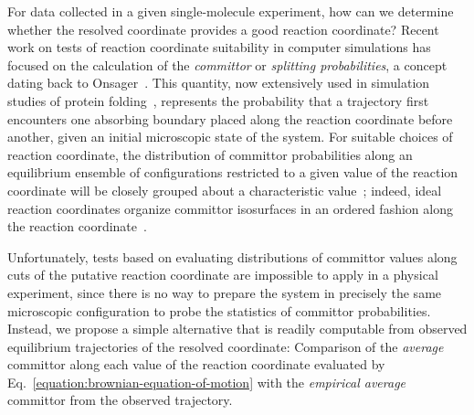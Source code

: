 \documentclass[aps,prl,twocolumn,superscriptaddress,floatfix]{revtex4-1}
\begin{document}
For data collected in a given single-molecule experiment, how can we determine whether the resolved coordinate provides a good reaction coordinate?
Recent work on tests of reaction coordinate suitability in computer simulations has focused on the calculation of the \emph{committor} or \emph{splitting probabilities}, a concept dating back to Onsager~\cite{lange-grubmuller:jcp:2006:estimating-memory-functions}.
This quantity, now extensively used in simulation studies of protein folding~\cite{du-pande:jcp:1998:pfold}, represents the probability that a trajectory first encounters one absorbing boundary placed along the reaction coordinate before another, given an initial microscopic state of the system.
For suitable choices of reaction coordinate, the distribution of committor probabilities along an equilibrium ensemble of configurations restricted to a given value of the reaction coordinate will be closely grouped about a characteristic value~\cite{du-pande:jcp:1998:pfold,geissler:jpcb:1999:ion-dissociation,bolhuis:annu-rev-phys-chem:2002:transition-path-sampling,ma-dinner:jpcb:2005:automatic-reaction-coordinate-identification,peters:jcp:2006:histogram-test,peters:2010:cpl:committor}; indeed, ideal reaction coordinates organize committor isosurfaces in an ordered fashion along the reaction coordinate~\cite{rhee:jpcb:2005:splitting-probability}.

Unfortunately, tests based on evaluating distributions of committor values along cuts of the putative reaction coordinate are impossible to apply in a physical experiment, since there is no way to prepare the system in precisely the same microscopic configuration to probe the statistics of committor probabilities.
Instead, we propose a simple alternative that is readily computable from observed equilibrium trajectories of the resolved coordinate: Comparison of the \emph{average} committor along each value of the reaction coordinate evaluated by Eq.~\ref{equation:brownian-equation-of-motion} with the \emph{empirical average} committor from the observed trajectory.
\end{document}

